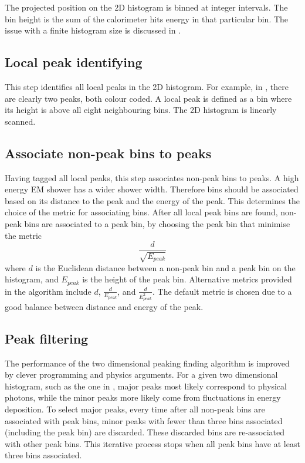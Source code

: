 The projected position on the 2D histogram is binned at integer intervals. The bin height is the sum of the calorimeter hits energy in that particular bin. The issue with a finite histogram size is discussed in .

\subsection{Local peak identifying}

This step identifies all local peaks in the 2D histogram. For example, in , there are clearly two peaks, both colour coded. A local peak is defined as a bin where its height is above all eight neighbouring bins. The 2D histogram is linearly scanned. %

\subsection{Associate non-peak bins to peaks}

Having tagged all local peaks, this step associates non-peak bins to peaks. A high energy EM shower has a wider shower width. Therefore bins should be associated based on its distance to the peak and the energy of the peak. This determines the choice of the metric for associating bins. After all local peak bins are found, non-peak bins are associated to a peak bin, by choosing the peak bin that minimise the metric
\begin{equation}
\frac{d}{\sqrt{E_{peak}}}
\end{equation}
where $d$ is the Euclidean distance between a non-peak bin and a peak bin on the histogram, and $E_{peak}$ is the height of the peak bin. Alternative metrics provided in the algorithm include $d$, $\frac{d}{{E_{peak}}}$, and $\frac{d}{{E_{peak}^2}}$. The default metric is chosen due to a good balance between distance and energy of the peak.


\subsection{Peak filtering}

The performance of the two dimensional peaking finding algorithm is improved by clever programming and physics arguments. For a given two dimensional histogram, such as the one in , major peaks most likely correspond to physical photons, while the minor peaks more likely come from fluctuations in energy deposition. To select major peaks, every time after all non-peak bins are associated with peak bins, minor peaks with fewer than three bins associated (including the peak bin) are discarded. These discarded bins are re-associated with other peak bins. This iterative process stops when all peak bins have at least three bins associated.

